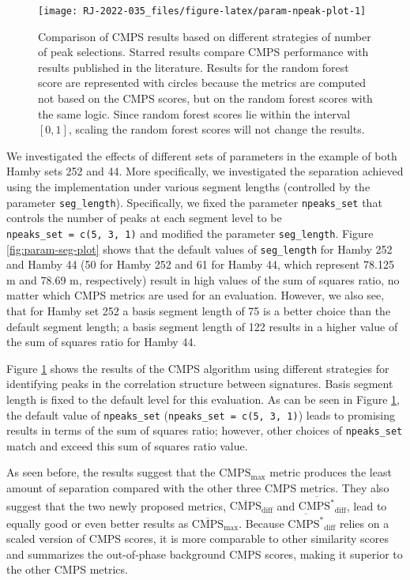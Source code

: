 \begin{figure}

{\centering \texttt{[image: RJ-2022-035\_files/figure-latex/param-npeak-plot-1]} 

}

\caption{Comparison of CMPS results based on different strategies of number of peak selections. Starred results compare CMPS performance with results published in the literature. Results for the random forest score are represented with circles because the metrics are computed not based on the CMPS scores, but on the random forest scores with the same logic. Since random forest scores lie within the interval $[0, 1]$, scaling the random forest scores will not change the results.}\label{fig:param-npeak-plot}
\end{figure}

We investigated the effects of different sets of parameters in the example of both Hamby sets 252 and 44.
More specifically, we investigated the separation achieved using the  implementation under various segment lengths (controlled by the parameter \texttt{seg\_length}). Specifically, we fixed the parameter \texttt{npeaks\_set} that controls the number of peaks at each segment level to be \texttt{npeaks\_set\ =\ c(5,\ 3,\ 1)} and modified the parameter \texttt{seg\_length}.
Figure \ref{fig:param-seg-plot} shows that the default values of \texttt{seg\_length} for Hamby 252 and Hamby 44 (50 for Hamby 252 and 61 for Hamby 44, which represent 78.125 \textmu m and 78.69 \textmu m, respectively) result in high values of the sum of squares ratio, no matter which CMPS metrics are used for an evaluation.
However, we also see, that for Hamby set 252 a basis segment length of 75 is a better choice than the default segment length; a basis segment length of 122 results in a higher value of the sum of squares ratio for Hamby 44.

Figure \ref{fig:param-npeak-plot} shows the results of the CMPS algorithm using different strategies for identifying peaks in the correlation structure between signatures. Basis segment length is fixed to the default level for this evaluation.
As can be seen in Figure \ref{fig:param-npeak-plot}, the default value of \texttt{npeaks\_set} (\texttt{npeaks\_set\ =\ c(5,\ 3,\ 1)}) leads to promising results in terms of the sum of squares ratio; however, other choices of \texttt{npeaks\_set} match and exceed this sum of squares ratio value.

As seen before, the results suggest that the \(\mathrm{CMPS_{max}}\) metric produces the least amount of separation compared with the other three CMPS metrics.
They also suggest that the two newly proposed metrics, \(\mathrm{\overline{CMPS}_{diff}}\) and \(\mathrm{\overline{CMPS^*}_{diff}}\), lead to equally good or even better results as \(\mathrm{\overline{CMPS}_{max}}\).
Because \(\mathrm{\overline{CMPS^*}_{diff}}\) relies on a scaled version of CMPS scores, it is more comparable to other similarity scores and summarizes the out-of-phase background CMPS scores, making it superior to the other CMPS metrics.

